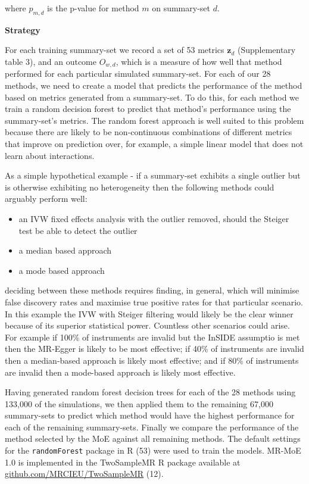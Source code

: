 \documentclass[]{article}
\providecommand{\tightlist}{%
  \setlength{\itemsep}{0pt}\setlength{\parskip}{0pt}}
\begin{document}
where \(p_{m,d}\) is the p-value for method \(m\) on summary-set \(d\).

\textbf{Strategy}

For each training summary-set we record a set of 53 metrics
\(\textbf{z}_{d}\) (Supplementary table 3), and an outcome \(O_{w,d}\),
which is a measure of how well that method performed for each particular
simulated summary-set. For each of our 28 methods, we need to create a
model that predicts the performance of the method based on metrics
generated from a summary-set. To do this, for each method we train a
random decision forest to predict that method's performance using the
summary-set's metrics. The random forest approach is well suited to this
problem because there are likely to be non-continuous combinations of
different metrics that improve on prediction over, for example, a simple
linear model that does not learn about interactions.

As a simple hypothetical example - if a summary-set exhibits a single
outlier but is otherwise exhibiting no heterogeneity then the following
methods could arguably perform well:

\begin{itemize}
\tightlist
\item
  an IVW fixed effects analysis with the outlier removed, should the
  Steiger test be able to detect the outlier
\item
  a median based approach
\item
  a mode based approach
\end{itemize}

deciding between these methods requires finding, in general, which will
minimise false discovery rates and maximise true positive rates for that
particular scenario. In this example the IVW with Steiger filtering
would likely be the clear winner because of its superior statistical
power. Countless other scenarios could arise. For example if 100\% of
instruments are invalid but the InSIDE assumptio is met then the
MR-Egger is likely to be most effective; if 40\% of instruments are
invalid then a median-based approach is likely most effective; and if
80\% of instruments are invalid then a mode-based approach is likely
most effective.

Having generated random forest decision trees for each of the 28 methods
using 133,000 of the simulations, we then applied them to the remaining
67,000 summary-sets to predict which method would have the highest
performance for each of the remaining summary-sets. Finally we compare
the performance of the method selected by the MoE against all remaining
methods. The default settings for the \texttt{randomForest} package in R
(53) were used to train the models. MR-MoE 1.0 is implemented in the
TwoSampleMR R package available at
\href{https://github.com/MRCIEU/TwoSampleMR}{github.com/MRCIEU/TwoSampleMR}
(12).
\end{document}
